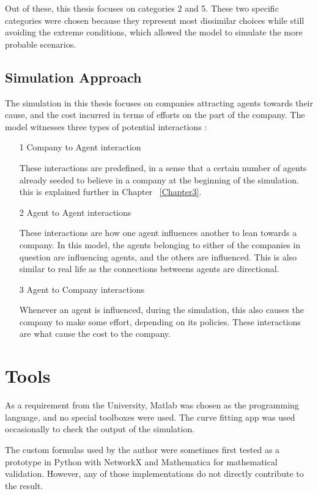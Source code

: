 Out of these, this thesis focuses on categories 2 and 5.
These two specific categories were chosen because they represent most dissimilar choices while still avoiding the extreme conditions, which allowed the model to simulate the more probable scenarios.

\subsection{Simulation Approach}

The simulation in this thesis focuses on companies attracting agents towards their cause, and the cost incurred in terms of efforts on the part of the company.
The model witnesses three types of potential interactions : 
\begin{enumerate}
\item[1] Company to Agent interaction 

These interactions are predefined, in a sense that a certain number of agents already seeded to believe in a company at the beginning of the simulation. this is explained further in Chapter ~\ref{Chapter3}.

\item[2] Agent to Agent interactions

These interactions are how one agent influences another to lean towards a company. In this model, the agents belonging to either of the companies in question are influencing agents, and the others are influenced. This is also similar to real life as the connections betweens agents are directional.

\item[3] Agent to Company interactions

Whenever an agent is influenced, during the simulation, this also causes the company to make some effort, depending on its policies. These interactions are what cause the cost to the company.


\end{enumerate}





\section{Tools}
As a requirement from the University, Matlab was chosen as the programming language, and no special toolboxes were used.
The curve fitting app was used occasionally to check the output of the simulation.

The custom formulas used by the author were sometimes first tested as a prototype in Python with NetworkX and Mathematica for mathematical validation. However, any of those implementations do not directly contribute to the result.
